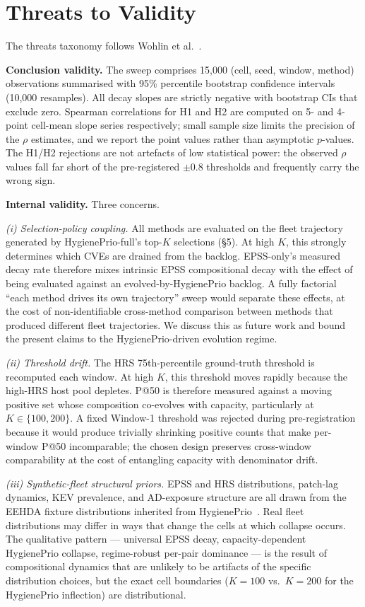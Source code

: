 \section{Threats to Validity}
\label{sec:threats}

The threats taxonomy follows Wohlin et al.~\cite{wohlin2012experimentation}.

\textbf{Conclusion validity.} The sweep comprises 15{,}000 (cell, seed,
window, method) observations summarised with 95\% percentile bootstrap
confidence intervals (10{,}000 resamples). All decay slopes are
strictly negative with bootstrap CIs that exclude zero. Spearman
correlations for H1 and H2 are computed on 5- and 4-point cell-mean
slope series respectively; small sample size limits the precision of
the $\rho$ estimates, and we report the point values rather than asymptotic
$p$-values. The H1/H2 rejections are not artefacts of low statistical
power: the observed $\rho$ values fall far short of the pre-registered
$\pm 0.8$ thresholds and frequently carry the wrong sign.

\textbf{Internal validity.} Three concerns.

\textit{(i) Selection-policy coupling.} All methods are evaluated on
the fleet trajectory generated by HygienePrio-full's top-$K$ selections
(\S5). At high $K$, this strongly determines which CVEs are drained
from the backlog. EPSS-only's measured decay rate therefore mixes
intrinsic EPSS compositional decay with the effect of being evaluated
against an evolved-by-HygienePrio backlog. A fully factorial
``each method drives its own trajectory'' sweep would separate these
effects, at the cost of non-identifiable cross-method comparison
between methods that produced different fleet trajectories. We discuss
this as future work and bound the present claims to the
HygienePrio-driven evolution regime.

\textit{(ii) Threshold drift.} The HRS 75th-percentile ground-truth
threshold is recomputed each window. At high $K$, this threshold
moves rapidly because the high-HRS host pool depletes. P@50 is
therefore measured against a moving positive set whose composition
co-evolves with capacity, particularly at $K \in \{100, 200\}$. A
fixed Window-1 threshold was rejected during pre-registration because
it would produce trivially shrinking positive counts that make
per-window P@50 incomparable; the chosen design preserves cross-window
comparability at the cost of entangling capacity with denominator drift.

\textit{(iii) Synthetic-fleet structural priors.} EPSS and HRS
distributions, patch-lag dynamics, KEV prevalence, and AD-exposure
structure are all drawn from the EEHDA fixture distributions inherited
from HygienePrio~\cite{paper4hygieneprio}. Real fleet distributions
may differ in ways that change the cells at which collapse occurs.
The qualitative pattern --- universal EPSS decay, capacity-dependent
HygienePrio collapse, regime-robust per-pair dominance --- is the
result of compositional dynamics that are unlikely to be artifacts of
the specific distribution choices, but the exact cell boundaries
($K = 100$ vs.\ $K = 200$ for the HygienePrio inflection) are
distributional.


